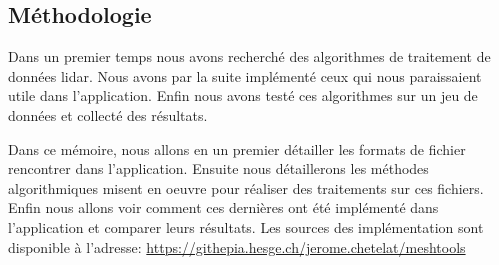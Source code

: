 \subsection*{Méthodologie}
Dans un premier temps nous avons recherché des algorithmes de
traitement de données lidar. Nous avons par la suite implémenté ceux qui nous
paraissaient utile dans l'application. Enfin nous avons testé ces algorithmes sur
un jeu de données et collecté des résultats.

Dans ce mémoire, nous allons en un premier détailler les formats de fichier rencontrer dans l'application.
Ensuite nous détaillerons les méthodes algorithmiques misent en oeuvre pour
réaliser des traitements sur ces fichiers.
Enfin nous allons voir comment ces dernières ont été implémenté dans
l'application et comparer leurs résultats.
Les sources des implémentation sont disponible à l'adresse: \href{https://githepia.esge.ch/jerome.chetelat/meshtools}{https://githepia.hesge.ch/jerome.chetelat/meshtools}

